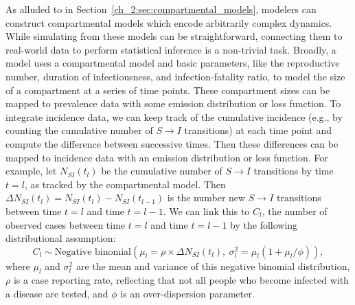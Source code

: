 As alluded to in Section~\ref{ch_2:sec:compartmental_models}, modelers can construct compartmental models which encode arbitrarily complex dynamics.
While simulating from these models can be straightforward, connecting them to real-world data to perform statistical inference is a non-trivial task.
Broadly, a model uses a compartmental model and basic parameters, like the reproductive number, duration of infectiousness, and infection-fatality ratio, to model the size of a compartment at a series of time points.
These compartment sizes can be mapped to prevalence data with some emission distribution or loss function.
To integrate incidence data, we can keep track of the cumulative incidence (e.g., by counting the cumulative number of \( S \to I \) transitions) at each time point and compute the difference between successive times.
Then these differences can be mapped to incidence data with an emission distribution or loss function.
For example, let \( N_{S I}(t_l) \) be the cumulative number of \( S \to I \) transitions by time \( t = l \), as tracked by the compartmental model.
Then \( \Delta N_{S I}(t_l) = N_{S I}(t_l) - N_{S I}(t_{l-1}) \) is the number new \( S \to I \) transitions between time \( t = l \) and time \( t = l - 1 \).
We can link this to \( C_l \), the number of observed cases between time \( t = l \) and time \( t = l - 1 \) by the following distributional assumption:
\begin{equation}
C_l \sim \text{Negative binomial}\left (\mu_l =  \rho \times \Delta N_{S I}(t_l),\ {\sigma^2_l} = \mu_l (1 + \mu_l / \phi )\right ),
\label{ch_2:eqn:example_case_emission}
\end{equation}
where \( \mu_l \) and \( \sigma^2_l \) are the mean and variance of this negative binomial distribution, \( \rho \) is a case reporting rate, reflecting that not all people who become infected with a disease are tested, and \( \phi \) is an over-dispersion parameter.

